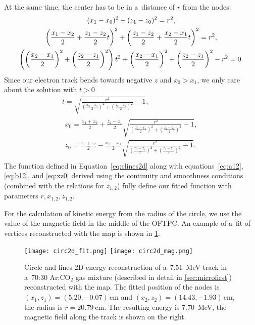 			At the same time, the center has to be in a~distance of $r$ from the nodes:
				\begin{gather}
					(x_1-x_0)^2 + (z_1-z_0)^2 = r^2,\notag\\
					\left(\frac{x_1-x_2}{2}+\frac{z_1-z_2}{2}t\right)^2 + \left(\frac{z_1-z_2}{2}+\frac{x_2-x_1}{2}t\right)^2 = r^2,\notag\\
					\left(\left(\frac{x_2-x_1}{2}\right)^2+\left(\frac{z_2-z_1}{2}\right)^2\right)t^2+\left(\frac{x_2-x_1}{2}\right)^2+\left(\frac{z_2-z_1}{2}\right)^2-r^2=0.
				\end{gather}
			Since our electron track bends towards negative $z$ and $x_2 > x_1$, we only care about the solution with $t>0$
				\begin{gather}
					t = \sqrt{\frac{r^2}{\left(\frac{x_2-x_1}{2}\right)^2+\left(\frac{z_2-z_1}{2}\right)^2}-1},\\
					\begin{aligned}
						x_0 = \frac{x_1+x_2}{2} + \frac{z_2-z_1}{2} \sqrt{\frac{r^2}{\left(\frac{x_2-x_1}{2}\right)^2+\left(\frac{z_2-z_1}{2}\right)^2}-1},\label{eq:xz0}\\
						z_0 = \frac{z_1+z_2}{2} - \frac{x_2-x_1}{2} \sqrt{\frac{r^2}{\left(\frac{x_2-x_1}{2}\right)^2+\left(\frac{z_2-z_1}{2}\right)^2}-1}.
					\end{aligned}
				\end{gather}
			The function defined in Equation~\ref{eq:clines2d} along with equations~\ref{eq:a12}, \ref{eq:b12}, and \ref{eq:xz0} derived using the continuity and smoothness conditions (combined with the relations for $z_{1,2}$) fully define our fitted function with parameters $r,x_{1,2},z_{1,2}$.
			
			For the calculation of kinetic energy from the radius of the circle, we use the value of the magnetic field in the middle of the \ac{OFTPC}. An example of a~fit of vertices reconstructed with the map is shown in \cref{fig:circle2d}.
			
			\begin{figure}
				\centering
				\texttt{[image: circ2d\_fit.png]}
				\hfill
				\texttt{[image: circ2d\_mag.png]}
				\caption{Circle and lines 2D energy reconstruction of a~\qty{7.51}{\MeV} track in a~70:30 Ar:CO$_2$ gas mixture (described in detail in \cref{sec:microfirst}) reconstructed with the map. The fitted position of the nodes is $(x_1,z_1) = (5.20,-0.07)\,\unit{\cm}$ and $(x_2,z_2) = (14.43,-1.93)\,\unit{\cm}$, the radius is $r = \qty{20.79}{\cm}$. The resulting energy is \qty{7.70}{\MeV}, the magnetic field along the track is shown on the right.}
				\label{fig:circle2d}
			\end{figure}
		
